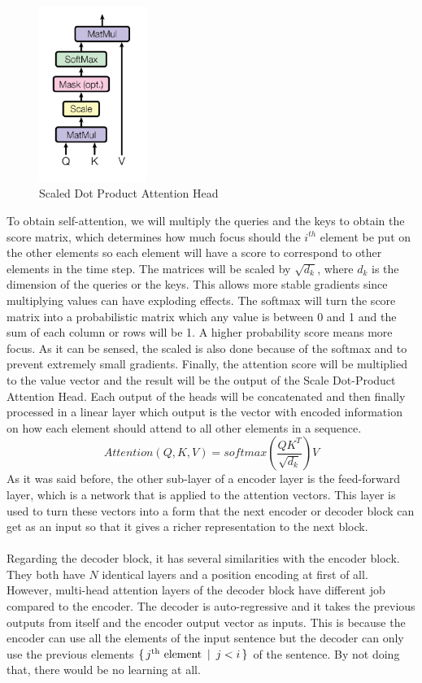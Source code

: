 \documentclass[11pt, a4paper]{article}
\begin{document}
	\begin{figure}[H]
		\centering
		\includegraphics[width=3.5cm]{imgs/relatedwork/transformer-scale-dot-product-attention}
		\caption{Scaled Dot Product Attention Head}
		\label{fig:related-transformer-head}
	\end{figure}
	To obtain self-attention, we will multiply the queries and the keys to obtain the score matrix, which determines how much focus should the $i^{th}$ element be put on the other elements so each element will have a score to correspond to other elements in the time step. The matrices will be scaled by $\sqrt{d_k}$, where $d_k$ is the dimension of the queries or the keys. This allows more stable gradients since multiplying values can have exploding effects. The softmax will turn the score matrix into a probabilistic matrix which any value is between 0 and 1 and the sum of each column or rows will be 1. A higher probability score means more focus. As it can be sensed, the scaled is also done because of the softmax and to prevent extremely small gradients. Finally, the attention score will be multiplied to the value vector and the result will be the output of the Scale Dot-Product Attention Head. Each output of the heads will be concatenated and then finally processed in a linear layer which output is the vector with encoded information on how each element should attend to all other elements in a sequence.
	\[Attention(Q, K, V) = softmax(\frac{QK^T}{\sqrt{d_k}}) V\]
	As it was said before, the other sub-layer of a encoder layer is the feed-forward layer, which is a network that is applied to the attention vectors. This layer is used to turn these vectors into a form that the next encoder or decoder block can get as an input so that it gives a richer representation to the next block.
	\\
	\\
	Regarding the decoder block, it has several similarities with the encoder block. They both have $N$ identical layers and a position encoding at first of all. However, multi-head attention layers of the decoder block have different job compared to the encoder. The decoder is auto-regressive and it takes the previous outputs from itself and the encoder output vector as inputs. This is because the encoder can use all the elements of the input sentence  but the decoder can only use the previous elements $\{ \, j\text{\textsuperscript{th} element} \, \, \, | \, \, \, j < i \, \}$ of the sentence. By not doing that, there would be no learning at all.
\end{document}
